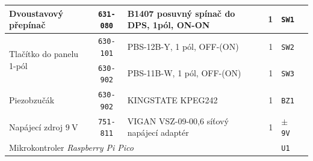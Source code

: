 \documentclass[twoside,project,skipblank]{../MFFPrace}
\begin{document}
\begin{landscape}
\begin{table}[!h]
\begin{tabular}{|l|l||c|l|r||l|l|l|l|}
            \multicolumn{2}{|l||}{Dvoustavový přepínač}                                  & \texttt{631-080}                               & \tiny{B1407 posuvný spínač do DPS, 1pól, ON-ON}  & 1                                                        & \texttt{SW1}                         & \multicolumn{3}{l|}{}                                                                  \\\hline
            \multicolumn{2}{|l||}{\multirow{2}{*}{Tlačítko do panelu 1-pól}}             & \texttt{630-101}                               & \tiny{PBS-12B-Y, 1 pól, OFF-(ON)}                & 1                                                        & \texttt{SW2}                         & \multicolumn{3}{l|}{}                                                                  \\\cline{3-9}
            \multicolumn{2}{|l||}{}                                                      & \texttt{630-902}                               & \tiny{PBS-11B-W, 1 pól, OFF-(ON)}                & 1                                                        & \texttt{SW3}                         & \multicolumn{3}{l|}{}                                                                  \\\hline
            \multicolumn{2}{|l||}{Piezobzučák}                                           & \texttt{630-902}                               & \tiny{KINGSTATE KPEG242}                         & 1                                                        & \texttt{BZ1}                         & \multicolumn{3}{l|}{}                                                                  \\\hline
            \multicolumn{2}{|l||}{Napájecí zdroj $9\:\text{V}$}                          & \texttt{751-811}                               & \tiny{VIGAN VSZ-09-00,6 síťový napájecí adaptér} & 1                                                        & \texttt{$\pm$9V}                     & \multicolumn{3}{l|}{}                                                                  \\\hline
            \multicolumn{5}{|l||}{Mikrokontroler \textit{Raspberry Pi Pico}}             & \texttt{U1}                                    & \multicolumn{3}{l|}{}                                                                                                                                                                                                                       \\\hline
        \end{tabular}\\

\end{table}
\end{landscape}
\end{document}
